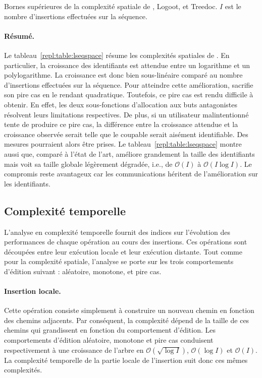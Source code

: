 \begin{table}
  \begin{center}
    \caption[Bornes supérieures de la complexité spatiale de \LSEQ, Logoot, et
    Treedoc] {\label{repl:table:lseqspace} Bornes supérieures de la complexité
      spatiale de \LSEQ, Logoot, et Treedoc. $I$ est le nombre d'insertions
      effectuées sur la séquence.}
    
  \end{center}
\end{table}

\paragraph{Résumé.} Le tableau~\ref{repl:table:lseqspace} résume les complexités
spatiales de \LSEQ. En particulier, la croissance des identifiants est attendue
entre un logarithme et un polylogarithme. La croissance est donc bien
sous-linéaire comparé au nombre d'insertions effectuées sur la séquence. Pour
atteindre cette amélioration, \LSEQ sacrifie son pire cas en le rendant
quadratique. Toutefois, ce pire cas est rendu difficile à obtenir. En effet, les
deux sous-fonctions d'allocation aux buts antagonistes résolvent leurs
limitations respectives. De plus, si un utilisateur malintentionné tente de
produire ce pire cas, la différence entre la croissance attendue et la
croissance observée serait telle que le coupable serait aisément
identifiable. Des mesures pourraient alors être prises. Le
tableau~\ref{repl:table:lseqspace} montre aussi que, comparé à l'état de l'art,
\LSEQ améliore grandement la taille des identifiants mais voit sa taille globale
légèrement dégradée, i.e., de $\mathcal{O}(I)$ à $\mathcal{O}(I\log I)$. Le
compromis reste avantageux car les communications héritent de l'amélioration sur
les identifiants.

\subsection{Complexité temporelle}

L'analyse en complexité temporelle fournit des indices sur l'évolution des
performances de chaque opération au cours des insertions. Ces opérations sont
découpées entre leur exécution locale et leur exécution distante. Tout comme
pour la complexité spatiale, l'analyse se porte sur les trois comportements
d'édition suivant : aléatoire, monotone, et pire cas.

\paragraph{Insertion locale.} Cette opération consiste simplement à construire
un nouveau chemin en fonction des chemins adjacents. Par conséquent, la
complexité dépend de la taille de ces chemins qui grandissent en fonction du
comportement d'édition. Les comportements d'édition aléatoire, monotone et pire
cas conduisent respectivement à une croissance de l'arbre en
$\mathcal{O}(\sqrt{\log I})$, $\mathcal{O}(\log I)$ et $\mathcal{O}(I)$. La
complexité temporelle de la partie locale de l'insertion suit donc ces mêmes
complexités.


